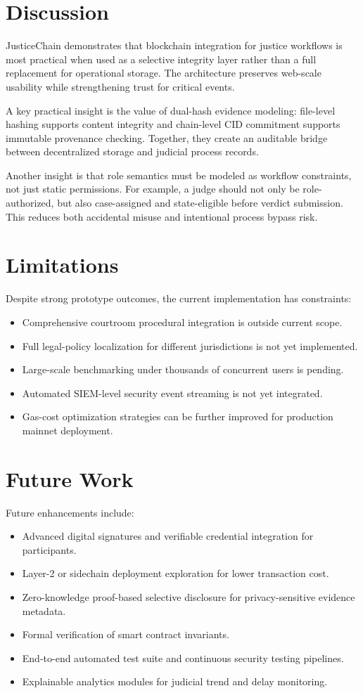 \documentclass[conference]{IEEEtran}
\begin{document}
\section{Discussion}
JusticeChain demonstrates that blockchain integration for justice workflows is most practical when used as a selective integrity layer rather than a full replacement for operational storage. The architecture preserves web-scale usability while strengthening trust for critical events.

A key practical insight is the value of dual-hash evidence modeling: file-level hashing supports content integrity and chain-level CID commitment supports immutable provenance checking. Together, they create an auditable bridge between decentralized storage and judicial process records.

Another insight is that role semantics must be modeled as workflow constraints, not just static permissions. For example, a judge should not only be role-authorized, but also case-assigned and state-eligible before verdict submission. This reduces both accidental misuse and intentional process bypass risk.

\section{Limitations}
Despite strong prototype outcomes, the current implementation has constraints:
\begin{itemize}
    \item Comprehensive courtroom procedural integration is outside current scope.
    \item Full legal-policy localization for different jurisdictions is not yet implemented.
    \item Large-scale benchmarking under thousands of concurrent users is pending.
    \item Automated SIEM-level security event streaming is not yet integrated.
    \item Gas-cost optimization strategies can be further improved for production mainnet deployment.
\end{itemize}

\section{Future Work}
Future enhancements include:
\begin{itemize}
    \item Advanced digital signatures and verifiable credential integration for participants.
    \item Layer-2 or sidechain deployment exploration for lower transaction cost.
    \item Zero-knowledge proof-based selective disclosure for privacy-sensitive evidence metadata.
    \item Formal verification of smart contract invariants.
    \item End-to-end automated test suite and continuous security testing pipelines.
    \item Explainable analytics modules for judicial trend and delay monitoring.
\end{itemize}
\end{document}
